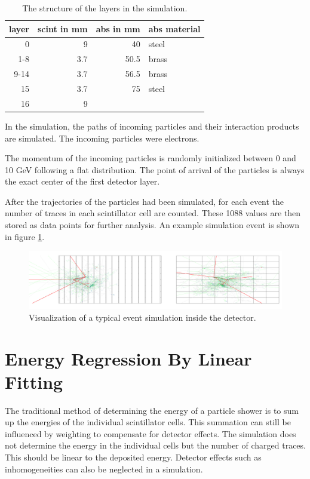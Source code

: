 \documentclass[12pt, a4paper]{thesis}
\begin{document}
\begin{table}[htbp]
  \centering
  \begin{tabular}{rrrl}
    layer & scint in mm & abs in mm & abs material\\
    \hline
    0 & 9 & 40 & steel\\
    1-8 & 3.7 & 50.5 & brass\\
    9-14 & 3.7 & 56.5 & brass\\
    15 & 3.7 & 75 & steel\\
    16 & 9 &  & \\
  \end{tabular}
  \caption{The structure of the layers in the simulation.}
  \label{fcn_structure}
\end{table}

In the simulation, the paths of incoming particles and their
interaction products are simulated. The incoming particles were
electrons.

The momentum of the incoming particles is randomly initialized between
0 and 10 GeV following a flat distribution. The point of arrival of
the particles is always the exact center of the first detector layer.

After the trajectories of the particles had been simulated, for each
event the number of traces in each scintillator cell are counted.
These 1088 values are then stored as data points for further
analysis. An example simulation event is shown in figure \ref{sim_exp}.

\begin{figure}[H]
  \centering
  \includegraphics[width=0.9 \textwidth]{../images/front-side.pdf}
  \caption{Visualization of a typical event simulation inside the
    detector.}
    \label{sim_exp}
\end{figure}


\section{Energy Regression By Linear Fitting}
\label{sec:orgd10286d}

The traditional method of determining the energy of a particle shower
is to sum up the energies of the individual scintillator cells. This
summation can still be influenced by weighting to compensate for
detector effects. The simulation does not determine the energy in the
individual cells but the number of charged traces. This should be
linear to the deposited energy. Detector effects such as
inhomogeneities can also be neglected in a simulation.
\end{document}
